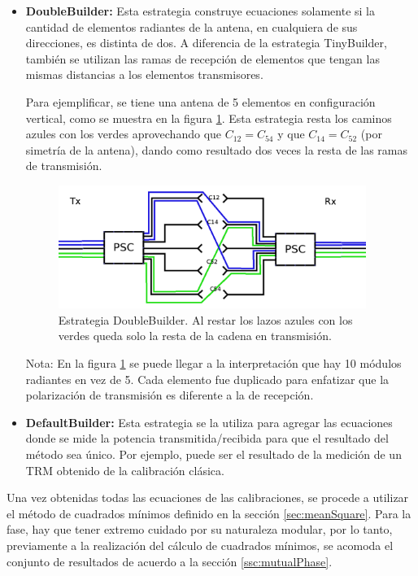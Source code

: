 \begin{itemize}
	\item \textbf{DoubleBuilder:} Esta estrategia construye ecuaciones solamente si la cantidad de elementos radiantes de la 
        antena, en cualquiera de sus direcciones, es distinta de dos. A diferencia de la estrategia TinyBuilder, también se 
        utilizan las ramas de recepción de elementos que tengan las mismas distancias a los elementos transmisores.
        
        Para ejemplificar, se tiene una antena de 5 elementos en configuración vertical, como se muestra en la figura 
		\ref{fig:doubleBuilder}. Esta estrategia resta los caminos azules con los verdes aprovechando que $C_{12} = C_{54}$ y que
		$C_{14} = C_{52}$ (por simetría de la antena), dando como resultado dos veces la resta de las ramas de transmisión.
		
		\begin{figure}[H]
		 \centering
		 \includegraphics[width=10cm]{gfx/doubleBuilder.png}
		 \caption{Estrategia DoubleBuilder. Al restar los lazos azules con los verdes queda solo la resta de la cadena en 
         transmisión.}
		 \label{fig:doubleBuilder}
		\end{figure}

        Nota: En la figura \ref{fig:doubleBuilder} se puede llegar a la interpretación que hay 10 módulos radiantes en vez 
        de 5. Cada elemento fue duplicado para enfatizar que la polarización de transmisión es diferente a la de recepción.

	\item \textbf{DefaultBuilder:} Esta estrategia se la utiliza para agregar las ecuaciones donde se mide la potencia 
		transmitida/recibida para que el resultado del método sea único. Por ejemplo, puede ser el resultado de la medición de un 
		TRM obtenido de la calibración clásica.
\end{itemize}


Una vez obtenidas todas las ecuaciones de las calibraciones, se procede a utilizar el método de cuadrados mínimos definido en 
la sección \ref{sec:meanSquare}. Para la fase, hay que tener extremo cuidado por su naturaleza modular, por lo tanto, 
previamente a la realización del cálculo de cuadrados mínimos, se acomoda el conjunto de resultados de acuerdo a la sección 
\ref{ssc:mutualPhase}.

